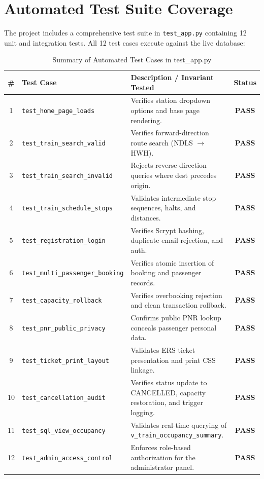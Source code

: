 \documentclass[12pt,a4paper]{report}
\begin{document}
\section{Automated Test Suite Coverage}
The project includes a comprehensive test suite in \texttt{test\_app.py} containing 12 unit and integration tests. All 12 test cases execute against the live database:

\begin{table}[H]
    \centering
    \small
    \begin{tabular}{@{}clp{8cm}c@{}}
        \toprule
        \textbf{\#} & \textbf{Test Case} & \textbf{Description / Invariant Tested} & \textbf{Status} \\
        \midrule
        1 & \texttt{test\_home\_page\_loads} & Verifies station dropdown options and base page rendering. & \textbf{PASS} \\
        2 & \texttt{test\_train\_search\_valid} & Verifies forward-direction route search (NDLS $\to$ HWH). & \textbf{PASS} \\
        3 & \texttt{test\_train\_search\_invalid} & Rejects reverse-direction queries where dest precedes origin. & \textbf{PASS} \\
        4 & \texttt{test\_train\_schedule\_stops} & Validates intermediate stop sequences, halts, and distances. & \textbf{PASS} \\
        5 & \texttt{test\_registration\_login} & Verifies Scrypt hashing, duplicate email rejection, and auth. & \textbf{PASS} \\
        6 & \texttt{test\_multi\_passenger\_booking} & Verifies atomic insertion of booking and passenger records. & \textbf{PASS} \\
        7 & \texttt{test\_capacity\_rollback} & Verifies overbooking rejection and clean transaction rollback. & \textbf{PASS} \\
        8 & \texttt{test\_pnr\_public\_privacy} & Confirms public PNR lookup conceals passenger personal data. & \textbf{PASS} \\
        9 & \texttt{test\_ticket\_print\_layout} & Validates ERS ticket presentation and print CSS linkage. & \textbf{PASS} \\
        10 & \texttt{test\_cancellation\_audit} & Verifies status update to CANCELLED, capacity restoration, and trigger logging. & \textbf{PASS} \\
        11 & \texttt{test\_sql\_view\_occupancy} & Validates real-time querying of \texttt{v\_train\_occupancy\_summary}. & \textbf{PASS} \\
        12 & \texttt{test\_admin\_access\_control} & Enforces role-based authorization for the administrator panel. & \textbf{PASS} \\
        \bottomrule
    \end{tabular}
    \caption{Summary of Automated Test Cases in test\_app.py}
    \label{tab:tests}
\end{table}
\end{document}
